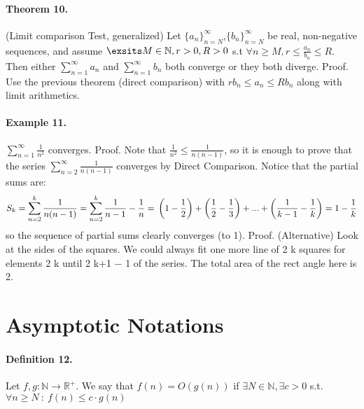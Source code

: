 \paragraph{Theorem 10.} (Limit comparison Test, generalized) Let \( \{a_n\}^{\infty}_{n = N} \),\( \{b_n\}^{\infty}_{n = N} \) be real, non-negative sequences,
and assume \( \exsits M \in \mathbb{N}, r > 0, R > 0 \)  s.t \( \forall n \ge M, r \le \frac{a_n}{b_n} \le R\). Then either \( \sum_{n=1}^{\infty}{a_n} \)
and \( \sum_{n=1}^{\infty}{b_n} \) both converge or they both diverge.
Proof. Use the previous theorem (direct comparison) with \(rb_n \le a_n \le Rb_n\) along with limit arithmetics.

\paragraph{Example 11.} \( \sum_{n=1}^{\infty}{\frac{1}{n^2}} \) converges.
Proof. Note that \( \frac{1}{n^2} \le \frac{1}{n(n-1)} \), so it is enough to prove that the series 
\( \sum_{n=2}^{\infty}{\frac{1}{n(n-1)}}\) converges by Direct Comparison. Notice that the partial sums are:
\begin{equation*}
    S_k = \sum_{n=2}^{k}{\frac{1}{n(n-1)}} = \sum_{n=2}^{k}{\frac{1}{n-1} - \frac{1}{n}} = \\ \left(1 - \frac{1}{2} \right) + \left( \frac{1}{2} - \frac{1}{3} \right) + ... + \left( \frac{1}{k-1} - \frac{1}{k} \right) = \\ 1 - \frac{1}{k}   
\end{equation*}
so the sequence of partial sums clearly converges (to 1).
Proof. (Alternative) Look at the sides of the squares. We could always fit one more line of 2
k
squares for elements 2
k until 2
k+1 − 1 of the
series. The total area of the rect angle here is 2.


\section{Asymptotic Notations}
\paragraph{Definition 12.} Let \( f, g : \mathbb{N} \rightarrow \mathbb{R}^{+} \). We say that \( f(n) = O(g(n))\)  if \( \exists N \in \mathbb{N}, \exists c > 0 \) s.t. \( \forall n \ge N \ : \ f(n) \le c \cdot g(n)\)
